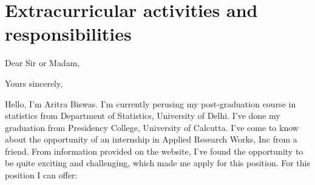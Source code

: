 \documentclass[11pt,a4paper,sans]{moderncv}        %
\begin{document}
\section{Extracurricular activities and responsibilities}
\begin{cvcolumns}
\end{cvcolumns}


\clearpage
\date{8th May 2016}
\opening{Dear Sir or Madam,}
\closing{Yours sincerely,}
\makelettertitle


Hello, \newline \newline I'm Aritra Biswas. I'm currently perusing my post-graduation course in statistics from Department of Statistics, University of Delhi. 
I've done my graduation from Presidency College, University of Calcutta. I've come to know about the opportunity of an internship in Applied Research Works, Inc from a friend. 
From information provided on the website, I've found the opportunity to be quite exciting and challenging, which made me apply for this position. For this position I can offer:
\newline
\end{document}
